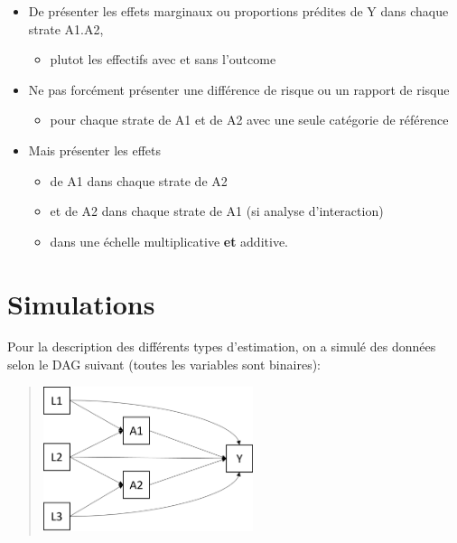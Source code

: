 \documentclass[
]{book}
\providecommand{\tightlist}{%
  \setlength{\itemsep}{0pt}\setlength{\parskip}{0pt}}
\begin{document}
\begin{itemize}
\tightlist
\item
  De présenter les effets marginaux ou proportions prédites de Y dans chaque strate A1.A2,

  \begin{itemize}
  \tightlist
  \item
    plutot les effectifs avec et sans l'outcome
  \end{itemize}
\item
  Ne pas forcément présenter une différence de risque ou un rapport de risque

  \begin{itemize}
  \tightlist
  \item
    pour chaque strate de A1 et de A2 avec une seule catégorie de référence
  \end{itemize}
\item
  Mais présenter les effets

  \begin{itemize}
  \tightlist
  \item
    de A1 dans chaque strate de A2
  \item
    et de A2 dans chaque strate de A1 (si analyse d'interaction)
  \item
    dans une échelle multiplicative \textbf{et} additive.
  \end{itemize}
\end{itemize}

\hypertarget{simulations}{%
\chapter{Simulations}\label{simulations}}

Pour la description des différents types d'estimation, on a simulé des données selon le DAG suivant (toutes les variables sont binaires):

\begin{quote}
\includegraphics[width=0.5\textwidth,height=\textheight]{img/Image10.png}
\end{quote}
\end{document}
